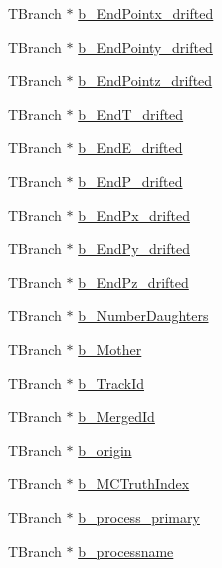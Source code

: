 \begin{DoxyCompactItemize}
\item 
T\-Branch $\ast$ \hyperlink{classanatree_abcdcf46dfd88b689f71c675acd9cc4a2}{b\-\_\-\-End\-Pointx\-\_\-drifted}
\item 
T\-Branch $\ast$ \hyperlink{classanatree_a55f8d2c4402b7f6e8b3e215c52578312}{b\-\_\-\-End\-Pointy\-\_\-drifted}
\item 
T\-Branch $\ast$ \hyperlink{classanatree_ac28ff5abc693b93d4426863036c5a023}{b\-\_\-\-End\-Pointz\-\_\-drifted}
\item 
T\-Branch $\ast$ \hyperlink{classanatree_a490287619d8e9c1901c0bb5d873a153b}{b\-\_\-\-End\-T\-\_\-drifted}
\item 
T\-Branch $\ast$ \hyperlink{classanatree_aacd9326557fb4368b09d1b266a6d966d}{b\-\_\-\-End\-E\-\_\-drifted}
\item 
T\-Branch $\ast$ \hyperlink{classanatree_a6f8f8f6ccfc3583fb9400ff012206107}{b\-\_\-\-End\-P\-\_\-drifted}
\item 
T\-Branch $\ast$ \hyperlink{classanatree_a7a2b895dc4fdc7d9d02928653278b7c5}{b\-\_\-\-End\-Px\-\_\-drifted}
\item 
T\-Branch $\ast$ \hyperlink{classanatree_a0d6c1738c50875ffb6dbab74de848e08}{b\-\_\-\-End\-Py\-\_\-drifted}
\item 
T\-Branch $\ast$ \hyperlink{classanatree_ace6097b3b1d7c95f50cf75ecd869d326}{b\-\_\-\-End\-Pz\-\_\-drifted}
\item 
T\-Branch $\ast$ \hyperlink{classanatree_a7088ff36700d36920cdef646aa39591a}{b\-\_\-\-Number\-Daughters}
\item 
T\-Branch $\ast$ \hyperlink{classanatree_a110733896bdb4cc1c0c084a3835ebff2}{b\-\_\-\-Mother}
\item 
T\-Branch $\ast$ \hyperlink{classanatree_a69cf89be813e633606052eea1503c4ad}{b\-\_\-\-Track\-Id}
\item 
T\-Branch $\ast$ \hyperlink{classanatree_afd227d379f802626ec86d884308c1e3c}{b\-\_\-\-Merged\-Id}
\item 
T\-Branch $\ast$ \hyperlink{classanatree_a12a0cb5a0e9e289e59d20ca5a90498a5}{b\-\_\-origin}
\item 
T\-Branch $\ast$ \hyperlink{classanatree_a9c9fb056f417e46436a767a47a2b0ac0}{b\-\_\-\-M\-C\-Truth\-Index}
\item 
T\-Branch $\ast$ \hyperlink{classanatree_af3f4d6108b3cb450a317a5a130303729}{b\-\_\-process\-\_\-primary}
\item 
T\-Branch $\ast$ \hyperlink{classanatree_a0f7e2b957aa1d011e051f92297eee41f}{b\-\_\-processname}
\item 

\end{DoxyCompactItemize}
